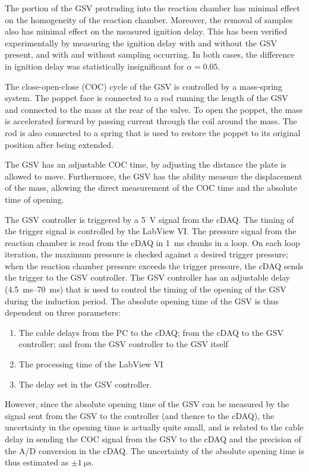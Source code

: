 \documentclass[../main.tex]{subfiles}
\begin{document}
The portion of the GSV protruding into the reaction chamber has minimal
effect on the homogeneity of the reaction chamber. Moreover, the removal of
samples also has minimal effect on the measured ignition delay.
This has been verified experimentally by measuring the ignition delay with
and without the GSV present, and with and without sampling occurring.
In both cases, the difference in ignition delay was statistically insignificant
for $\alpha=0.05$.

The close-open-close (COC) cycle of the GSV is controlled by a mass-spring
system. The poppet face is connected to a rod running the length of the
GSV and connected to the mass at the rear of the valve. To open the poppet,
the mass is accelerated forward by passing current through the coil around
the mass. The rod is also
connected to a spring that is used to restore the poppet to its original
position after being extended.

The GSV has an adjustable COC time, by adjusting the
distance the plate is allowed to move. Furthermore, the GSV has the ability
measure the displacement of the mass, allowing the direct measurement of
the COC time and the absolute time of opening.

The GSV controller is triggered by a \SI{5}{\volt} signal from the cDAQ.
The timing of the trigger signal is controlled by the LabView VI. The pressure
signal from the reaction chamber is read from the cDAQ in \SI{1}{\milli\second}
chunks in a loop. On each loop iteration, the maximum pressure is checked
against a desired trigger pressure; when the reaction chamber pressure exceeds
the trigger pressure, the cDAQ sends the trigger to the GSV controller. The
GSV controller has an adjustable delay (\SIrange{4.5}{70}{\milli\second}) that
is used to control the timing of the opening of the GSV during the induction period.
The absolute opening time of the GSV is thus dependent on three parameters:
\begin{enumerate}
\item The cable delays from the PC to the cDAQ; from the cDAQ to the GSV
      controller; and from the GSV controller to the GSV itself
\item The processing time of the LabView VI
\item The delay set in the GSV controller.
\end{enumerate}

However, since the absolute opening time of the GSV can be measured by
the signal sent from the GSV to the controller (and thence to the cDAQ),
the uncertainty in the opening time is actually quite small, and is related
to the cable delay in sending the COC signal from the GSV to the cDAQ and
the precision of the A/D conversion in the cDAQ. The uncertainty of the
absolute opening time is thus estimated as $\pm \SI{1}{\micro\second}$. 
\end{document}
